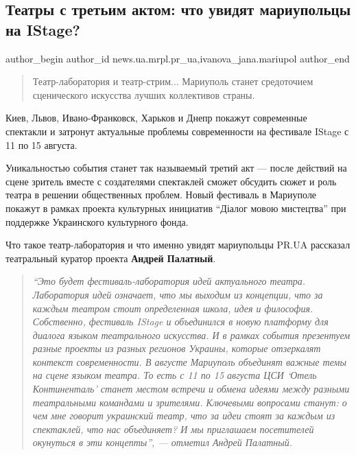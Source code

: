  
 
 
 
 
 
\subsection{Театры с третьим актом: что увидят мариупольцы на IStage?}
\label{sec:31_07_2021.stz.news.ua.mrpl.pr_ua.1.teatry_s_tretjim_aktom_istage}
 
\ifcmt
 author_begin
   author_id news.ua.mrpl.pr_ua,ivanova_jana.mariupol
 author_end
\fi

\begin{quote}
\Large
Театр-лаборатория и театр-стрим... Мариуполь станет средоточием сценического
искусства лучших коллективов страны. 
\end{quote}

Киев, Львов, Ивано-Франковск, Харьков и Днепр покажут современные спектакли и
затронут актуальные проблемы современности на фестивале IStage с 11 по 15
августа.

Уникальностью события станет так называемый третий акт — после действий на
сцене зритель вместе с создателями спектаклей сможет обсудить сюжет и роль
театра в решении общественных проблем. Новый фестиваль в Мариуполе покажут в
рамках проекта культурных инициатив \enquote{Діалог мовою мистецтва} при
поддержке Украинского культурного фонда.

Что такое театр-лаборатория и что именно увидят мариупольцы PR.UA рассказал
театральный куратор проекта \textbf{Андрей Палатный}.

\begin{quote}
\em
\enquote{Это будет фестиваль-лаборатория идей актуального театра. Лаборатория идей
означает, что мы выходим из концепции, что за каждым театром стоит определенная
школа, идея и философия. Собственно, фестиваль IStage и объединился в новую
платформу для диалога языком театрального искусства. И в рамках события
презентуем разные проекты из разных регионов Украины, которые отзеркалят
контекст современности. В августе Мариуполь объединят важные темы на сцене
языком театра. То есть с 11 по 15 августа ЦСИ \enquote{Отель Континенталь} станет
местом встречи и обмена идеями между разными театральными командами и
зрителями. Ключевыми вопросами станут: о чем мне говорит украинский театр, что
за идеи стоят за каждым из спектаклей, что нас объединяет? И мы приглашаем
посетителей окунуться в эти концепты}, — отметил Андрей Палатный.
\end{quote}


